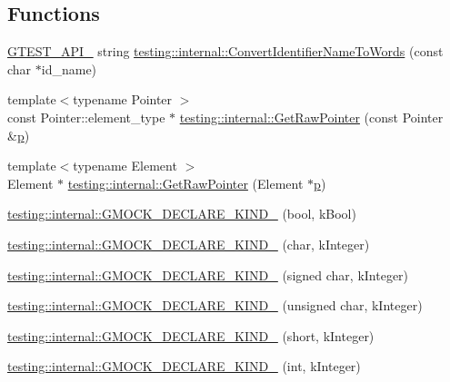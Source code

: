 \subsection*{Functions}
\begin{DoxyCompactItemize}
\item 
\hyperlink{gtest-port_8h_aa73be6f0ba4a7456180a94904ce17790}{G\+T\+E\+S\+T\+\_\+\+A\+P\+I\+\_\+} string \hyperlink{namespacetesting_1_1internal_a571db854f6de337007c53573c9cbf8a3}{testing\+::internal\+::\+Convert\+Identifier\+Name\+To\+Words} (const char $\ast$id\+\_\+name)
\item 
{\footnotesize template$<$typename Pointer $>$ }\\const Pointer\+::element\+\_\+type $\ast$ \hyperlink{namespacetesting_1_1internal_ae88d1a6f95165c43c27a6c0e2d357e61}{testing\+::internal\+::\+Get\+Raw\+Pointer} (const Pointer \&\hyperlink{jquery_8js_a2335e57f79b6acfb6de59c235dc8a83e}{p})
\item 
{\footnotesize template$<$typename Element $>$ }\\Element $\ast$ \hyperlink{namespacetesting_1_1internal_a4d17b114b61b805ac5f37e9c26e29e55}{testing\+::internal\+::\+Get\+Raw\+Pointer} (Element $\ast$\hyperlink{jquery_8js_a2335e57f79b6acfb6de59c235dc8a83e}{p})
\item 
\hyperlink{namespacetesting_1_1internal_a20f5584732e44a368e7acf295b639319}{testing\+::internal\+::\+G\+M\+O\+C\+K\+\_\+\+D\+E\+C\+L\+A\+R\+E\+\_\+\+K\+I\+N\+D\+\_\+} (bool, k\+Bool)
\item 
\hyperlink{namespacetesting_1_1internal_ac8f3722ca21d8b14f86e5c949e843508}{testing\+::internal\+::\+G\+M\+O\+C\+K\+\_\+\+D\+E\+C\+L\+A\+R\+E\+\_\+\+K\+I\+N\+D\+\_\+} (char, k\+Integer)
\item 
\hyperlink{namespacetesting_1_1internal_ae5b8e77d245fd0838ab22e439e92e9af}{testing\+::internal\+::\+G\+M\+O\+C\+K\+\_\+\+D\+E\+C\+L\+A\+R\+E\+\_\+\+K\+I\+N\+D\+\_\+} (signed char, k\+Integer)
\item 
\hyperlink{namespacetesting_1_1internal_ab13e89be2f0f22b1da9e22cd53bce5ce}{testing\+::internal\+::\+G\+M\+O\+C\+K\+\_\+\+D\+E\+C\+L\+A\+R\+E\+\_\+\+K\+I\+N\+D\+\_\+} (unsigned char, k\+Integer)
\item 
\hyperlink{namespacetesting_1_1internal_af191a2be9cff1d5900426ef5aa59851e}{testing\+::internal\+::\+G\+M\+O\+C\+K\+\_\+\+D\+E\+C\+L\+A\+R\+E\+\_\+\+K\+I\+N\+D\+\_\+} (short, k\+Integer)
\item 
\hyperlink{namespacetesting_1_1internal_a59fb8e3bb6f1fec656ed8bdab0048f9f}{testing\+::internal\+::\+G\+M\+O\+C\+K\+\_\+\+D\+E\+C\+L\+A\+R\+E\+\_\+\+K\+I\+N\+D\+\_\+} (int, k\+Integer)

\end{DoxyCompactItemize}
